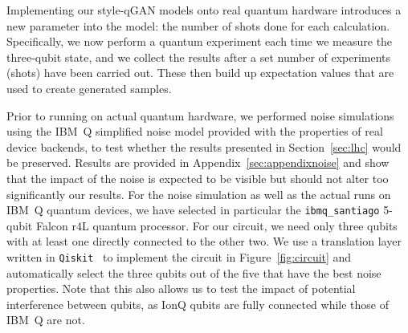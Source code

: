 \documentclass[twocolumn,preprintnumbers,superscriptaddress]{revtex4-2}
\begin{document}
Implementing our style-qGAN models onto real quantum hardware introduces a new parameter into the model: the number of shots done for each calculation. Specifically,  we now perform a quantum experiment each time we measure the three-qubit state, and we collect the results after a set number of experiments (shots) have been carried out. These then build up expectation values that are used to create generated samples.

 Prior to running on actual quantum hardware, we performed noise simulations using the
IBM~Q simplified noise model provided with the properties of real device backends, to test whether the results presented in Section~\ref{sec:lhc} would be preserved. Results are provided in Appendix~\ref{sec:appendixnoise} and show that the impact of the noise is expected to be visible but should not alter too significantly our
results. For the noise simulation as well as the actual runs on IBM~Q quantum devices,
we have selected in particular the {\tt ibmq\_santiago} 5-qubit Falcon r4L quantum processor. For our circuit, we need only three qubits with at least one directly connected to the other two. We use a translation layer written in \texttt{Qiskit}~\cite{gadi_aleksandrowicz_2019_2562111} to implement the circuit in Figure~\ref{fig:circuit} and automatically select the three qubits out of the five that have the best noise properties. Note that this also allows us to test the impact of potential
interference between qubits, as IonQ qubits are fully connected while those of IBM~Q are not.
\end{document}
